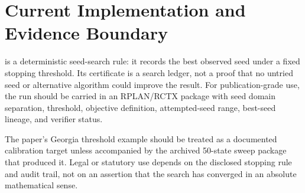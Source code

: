 \section{Current Implementation and Evidence Boundary}

\cs{} is a deterministic seed-search rule: it records the best observed seed
under a fixed stopping threshold.  Its certificate is a search ledger, not a
proof that no untried seed or alternative algorithm could improve the result.
For publication-grade use, the run should be carried in an RPLAN/RCTX package
with seed domain separation, threshold, objective definition, attempted-seed
range, best-seed lineage, and verifier status.

The paper's Georgia threshold example should be treated as a documented
calibration target unless accompanied by the archived 50-state sweep package
that produced it.  Legal or statutory use depends on the disclosed stopping
rule and audit trail, not on an assertion that the search has converged in an
absolute mathematical sense.
